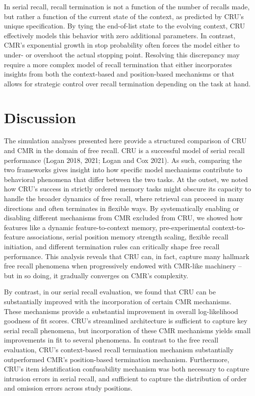 \documentclass[
  letterpaper,
  11pt,
  english,
  singlespacing,
  headsepline]{MastersDoctoralThesis}
\begin{document}
In serial recall, recall termination is not a function of the number of
recalls made, but rather a function of the current state of the context,
as predicted by CRU's unique specification. By tying the end-of-list
state to the evolving context, CRU effectively models this behavior with
zero additional parameters. In contrast, CMR's exponential growth in
stop probability often forces the model either to under- or overshoot
the actual stopping point. Resolving this discrepancy may require a more
complex model of recall termination that either incorporates insights
from both the context-based and position-based mechanisms or that allows
for strategic control over recall termination depending on the task at
hand.

\section{Discussion}\label{discussion-1}

The simulation analyses presented here provide a structured comparison
of CRU and CMR in the domain of free recall. CRU is a successful model
of serial recall performance (Logan 2018, 2021; Logan and Cox 2021). As
such, comparing the two frameworks gives insight into how specific model
mechanisms contribute to behavioral phenomena that differ between the
two tasks. At the outset, we noted how CRU's success in strictly ordered
memory tasks might obscure its capacity to handle the broader dynamics
of free recall, where retrieval can proceed in many directions and often
terminates in flexible ways. By systematically enabling or disabling
different mechanisms from CMR excluded from CRU, we showed how features
like a dynamic feature-to-context memory, pre-experimental
context-to-feature associations, serial position memory strength
scaling, flexible recall initiation, and different termination rules can
critically shape free recall performance. This analysis reveals that CRU
can, in fact, capture many hallmark free recall phenomena when
progressively endowed with CMR-like machinery -- but in so doing, it
gradually converges on CMR's complexity.

By contrast, in our serial recall evaluation, we found that CRU can be
substantially improved with the incorporation of certain CMR mechanisms.
These mechanisms provide a substantial improvement in overall
log-likelihood goodness of fit scores. CRU's streamlined architecture is
sufficient to capture key serial recall phenomena, but incorporation of
these CMR mechanisms yields small improvements in fit to several
phenomena. In contrast to the free recall evaluation, CRU's
context-based recall termination mechanism substantially outperformed
CMR's position-based termination mechanism. Furthermore, CRU's item
identification confusability mechanism was both necessary to capture
intrusion errors in serial recall, and sufficient to capture the
distribution of order and omission errors across study positions.
\end{document}
